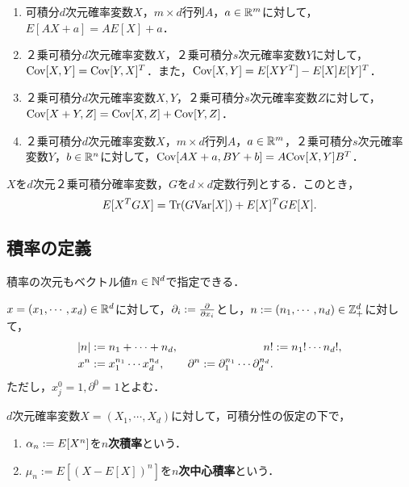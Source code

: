 \documentclass[uplatex,dvipdfmx]{jsreport}
\begin{document}
\begin{proposition}\mbox{}\label{prop-multidimensional-covariacne}
    \begin{enumerate}
        \item 可積分$d$次元確率変数$X$，$m\times d$行列$A$，$a\in\mathbb{R}^m$に対して，$E[AX+a]=AE[X]+a$．
        \item ２乗可積分$d$次元確率変数$X$，２乗可積分$s$次元確率変数$Y$に対して，$\mathrm{Cov}[X,Y]=\mathrm{Cov}[Y,X]^T$．また，$\mathrm{Cov}[X,Y]=E[XY^T]-E[X]E[Y]^T$．
        \item ２乗可積分$d$次元確率変数$X,Y$，２乗可積分$s$次元確率変数$Z$に対して，$\mathrm{Cov}[X+Y,Z]=\mathrm{Cov}[X,Z]+\mathrm{Cov}[Y,Z]$．
        \item ２乗可積分$d$次元確率変数$X$，$m\times d$行列$A$，$a\in\mathbb{R}^m$，２乗可積分$s$次元確率変数$Y$，$b\in\mathbb{R}^n$に対して，$\mathrm{Cov}[AX+a,BY+b]=A\mathrm{Cov}[X,Y]B^T$．
    \end{enumerate}
\end{proposition}

\begin{proposition}
    $X$を$d$次元２乗可積分確率変数，$G$を$d\times d$定数行列とする．このとき，
    \[E[X^TGX]=\mathrm{Tr}(G\mathrm{Var}[X])+E[X]^TGE[X].\]
\end{proposition}

\subsection{積率の定義}

\begin{tcolorbox}[colframe=ForestGreen, colback=ForestGreen!10!white,breakable,colbacktitle=ForestGreen!40!white,coltitle=black,fonttitle=\bfseries\sffamily,
    title=]
    積率の次元もベクトル値$n\in\mathbb{N}^d$で指定できる．
\end{tcolorbox}

\begin{notation}
    $x=(x_1,\cdots,x_d)\in\mathbb{R}^d$に対して，$\partial_i:=\frac{\partial }{\partial x_i}$とし，$n:=(n_1,\cdots,n_d)\in\mathbb{Z}^d_+$に対して，
    \begin{align*}
        \lvert n\rvert&:=n_1+\cdots+n_d,&n!&:=n_1!\cdots n_d!,\\
        x^n&:=x_1^{n_1}\cdots x_d^{n_d},&\partial^n:=\partial_1^{n_1}\cdots\partial_d^{n_d}.
    \end{align*}
    ただし，$x^0_j=1,\partial^0=1$とよむ．
\end{notation}

\begin{definition}
    $d$次元確率変数$X=(X_1,\cdots,X_d)$に対して，可積分性の仮定の下で，
    \begin{enumerate}
        \item $\alpha_n:=E[X^n]$を\textbf{$n$次積率}という．
        \item $\mu_n:=E[(X-E[X])^n]$を\textbf{$n$次中心積率}という．
    \end{enumerate}
\end{definition}
\end{document}
